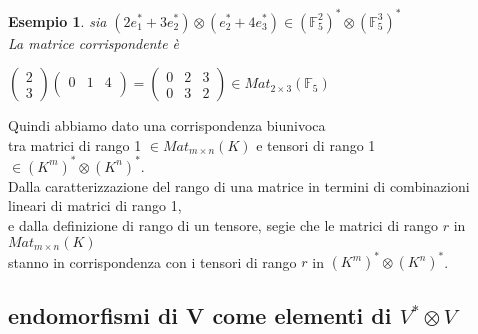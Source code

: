 \documentclass[a4paper,12pt]{article}
\theoremstyle{def}
\theoremstyle{prop}
\theoremstyle{esempio}
\newtheorem*{example}{Esempio}
\theoremstyle{dimostrazione}
\theoremstyle{teo}
\theoremstyle{osservazione}
\begin{document}
\begin{example}
	sia \((2 e_1^* + 3 e_2^*) \otimes (e_2^* + 4 e_3^*) \in (\mathbb{F}_5^2)^* \otimes (\mathbb{F}_5^3)^*\)\\
	La matrice corrispondente è
	\begin{center}
		\(\begin{pmatrix}
			2 \\
			3
		\end{pmatrix} \begin{pmatrix}
			0 & 1 & 4 \\
		\end{pmatrix} = \begin{pmatrix}
			0 & 2 & 3 \\
			0 & 3 & 2
		\end{pmatrix} \in Mat_{2 \times 3}(\mathbb{F}_5)\)
	\end{center}
\end{example}

\newpage

Quindi abbiamo dato una corrispondenza biunivoca\\
tra matrici di rango 1 \(\in Mat_{m \times n}(K)\) e tensori di rango 1 \(\in (K^m)^* \otimes (K^n)^*\).\\
Dalla caratterizzazione del rango di una matrice in termini di combinazioni lineari di matrici di rango 1,\\
e dalla definizione di rango di un tensore, segie che le matrici di rango \(r\) in \(Mat_{m \times n}(K)\)\\
stanno in corrispondenza con i tensori di rango \(r\) in \((K^m)^* \otimes (K^n)^*\).\\

\newpage

\subsection{endomorfismi di V come elementi di \(V^* \otimes V\)}
\end{document}
